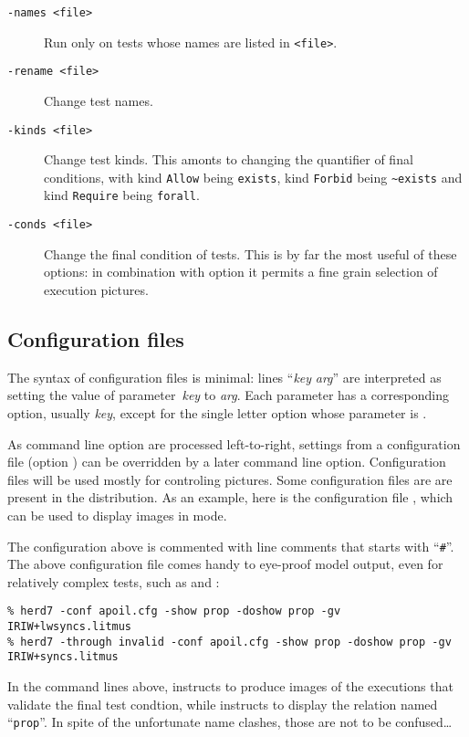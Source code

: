 \begin{description}
\item[{\tt -names <file>}] Run \herd{} only on tests whose names are
listed in \texttt{<file>}.
\item[{\tt -rename <file>}] Change test names.
\item[{\tt -kinds <file>}] Change test kinds.
This amonts to changing the quantifier of final conditions, with
kind \texttt{Allow} being \verb+exists+,
kind \texttt{Forbid} being \verb+~exists+
and kind \texttt{Require} being \verb+forall+.
\item[{\tt -conds <file>}] Change the final condition of tests.
This is by far the most useful of these options:
in combination with option  it permits a fine grain
selection of execution pictures.
\end{description}

\subsection{\label{herd:configfile}{Configuration files}}
The syntax of configuration files is minimal:
lines ``\textit{key} \textit{arg}'' are interpreted
as setting the value of parameter~\textit{key} to \textit{arg}.
Each parameter has a corresponding option,
usually \opt{-}\textit{key}, except for the single letter
option  whose parameter is .

As command line option are processed left-to-right,
settings from a configuration file (option )
can be overridden by a later command line option.
Configuration files will be used mostly for controling pictures.
Some configuration files are
are present in the distribution.
As an example, here is the configuration file ,
which can be used to display images in  mode.

The configuration above is commented with line comments that starts
with ``\verb+#+''.
The above configuration file comes handy to eye-proof model output,
even for relatively complex tests, such as 
and :
\begin{verbatim}
% herd7 -conf apoil.cfg -show prop -doshow prop -gv IRIW+lwsyncs.litmus
% herd7 -through invalid -conf apoil.cfg -show prop -doshow prop -gv IRIW+syncs.litmus
\end{verbatim}
In the command lines above, 
instructs \herd{} to produce images of the executions that validate
the final test condtion, while 
instructs \herd{} to display the relation named ``\texttt{prop}''.
In spite of the unfortunate name clashes, those are not to be confused\ldots

